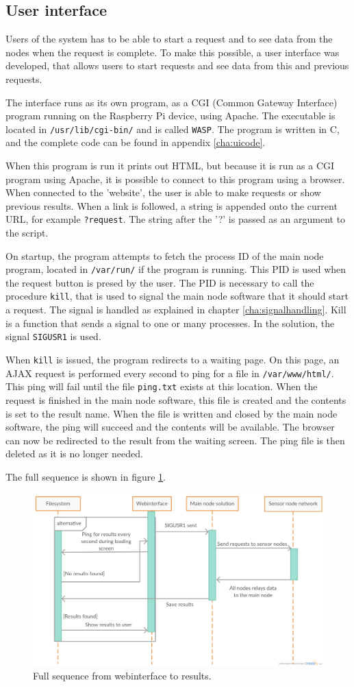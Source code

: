 \subsection{User interface} \label{cha:webinterface}
Users of the system has to be able to start a request and to see data from the nodes when the request is complete. To make this possible, a user interface was developed, that allows users to start requests and see data from this and previous requests.

The interface runs as its own program, as a CGI (Common Gateway Interface) program running on the Raspberry Pi device, using Apache. The executable is located in \texttt{/usr/lib/cgi-bin/} and is called \texttt{WASP}. The program is written in C, and the complete code can be found in appendix \ref{cha:uicode}.

When this program is run it prints out HTML, but because it is run as a CGI program using Apache, it is possible to connect to this program using a browser. When connected to the 'website', the user is able to make requests or show previous results. When a link is followed, a string is appended onto the current URL, for example \texttt{?request}. The string after the '?' is passed as an argument to the script.

On startup, the program attempts to fetch the process ID of the main node program, located in \texttt{/var/run/} if the program is running. This PID is used when the request button is presed by the user. The PID is necessary to call the procedure \texttt{kill}, that is used to signal the main node software that it should start a request. The signal is handled as explained in chapter \ref{cha:signalhandling}. Kill is a function that sends a signal to one or many processes. In the solution, the signal \texttt{SIGUSR1} is used.

When \texttt{kill} is issued, the program redirects to a waiting page. On this page, an AJAX request is performed every second to ping for a file in \texttt{/var/www/html/}. This ping will fail until the file \texttt{ping.txt} exists at this location. When the request is finished in the main node software, this file is created and the contents is set to the result name. When the file is written and closed by the main node software, the ping will succeed and the contents will be available. The browser can now be redirected to the result from the waiting screen. The ping file is then deleted as it is no longer needed.

The full sequence is shown in figure \ref{fig:sigsequence}.
\begin{figure}[h!]
\centering
\includegraphics[width=1.1\textwidth]{chapters/implementation/figures/sigsequence.png}
\caption{Full sequence from webinterface to results\cite{creately}.}
\label{fig:sigsequence}
\end{figure}
